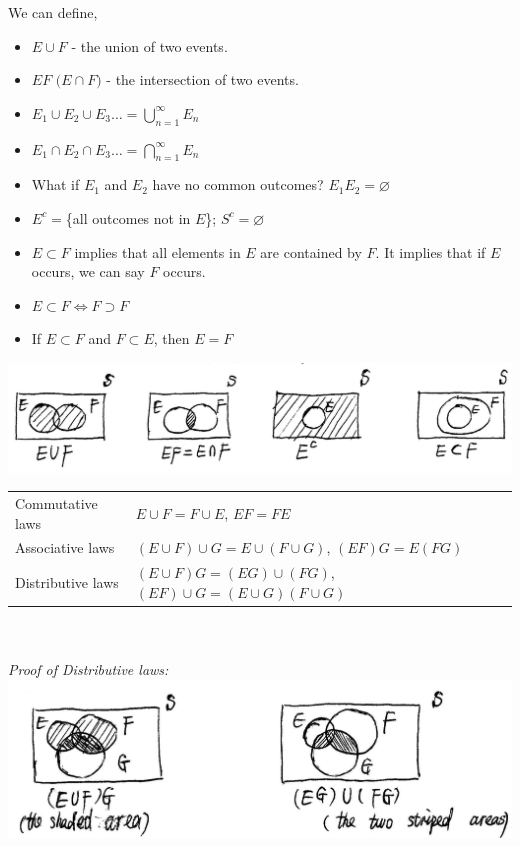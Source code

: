 \documentclass[11pt, letterpaper]{article}
\begin{document}
\clearpage
\noindent
We can define,
\begin{itemize}
  \item $E \cup F$ - the union of two events.
  \item $EF\text{ (}E \cap F\text{)}$ - the intersection of two events.
  \item $E_1 \cup E_2 \cup E_3 \dots = \bigcup_{n=1}^\infty E_n$
  \item $E_1 \cap E_2 \cap E_3 \dots = \bigcap_{n=1}^\infty E_n$
  \item What if $E_1$ and $E_2$ have no common outcomes? $E_1E_2 = \varnothing$
  \item $E^c = $\{all outcomes not in $E$\}; $S^c = \varnothing$
  \item $E \subset F$ implies that all elements in $E$ are contained by $F$. It implies that if $E$ occurs, we can say $F$ occurs.
  \item $E \subset F \Leftrightarrow F \supset F$
  \item If $E \subset F$ and $F \subset E$, then $E=F$
\end{itemize}
\includegraphics[scale=0.5]{2-1} \\
\begin{tabular}{l l}
  Commutative laws & $E \cup F = F \cup E$, \quad $EF = FE$ \\
  Associative laws & $(E \cup F) \cup G = E \cup (F \cup G)$, \quad $(EF)G = E(FG)$ \\
  Distributive laws & $(E \cup F)G  = (EG) \cup (FG)$, \quad $(EF) \cup G = (E \cup G)(F \cup G)$
\end{tabular} \\ \\
\noindent
\textit{Proof of Distributive laws:} \\
\includegraphics[scale=0.3]{2-2}
\end{document}

